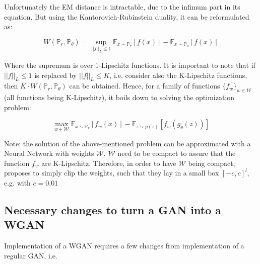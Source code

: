 \documentclass[11pt,a4paper,twoside]{report}
\begin{document}
Unfortunately the EM distance is intractable, due to the infimum part in its equation. But using the Kantorovich-Rubinstein duality, it can be reformulated as:



\begin{equation}
    W(\mathbb{P}_r, \mathbb{P}_{\theta}) = \sup_{||f||_L \leq 1} \mathbb{E}_{x \sim \mathbb{P}_r} [f(x)] - \mathbb{E}_{x \sim \mathbb{P}_{\theta}} [f(x)] 
\end{equation}

Where the supremum is over 1-Lipschitz functions. It is important to note that if $||f||_L \leq 1$  is replaced by $||f||_L \leq K$, i.e. consider also the K-Lipschitz functions, then $K \cdot W(\mathbb{P}_r, \mathbb{P}_{\theta})$ can be obtained. Hence, for a family of functions $\{f_w\}_{w \in \mathcal{W}}$ (all functions being K-Lipschitz), it boils down to solving the optimization problem:

\begin{equation}
    \max_{w \in \mathcal{W}}  \mathbb{E}_{x \sim \mathbb{P}_r}[f_w(x)] - \mathbb{E}_{z \sim p(z)}[f_w(g_{\theta}(z))]
\end{equation}

Note: the solution of the above-mentioned problem can be approximated with a Neural Network with weights $\mathcal{W}$. $\mathcal{W}$ need to be compact to assure that the function $f_w$ are K-Lipschitz. Therefore, in order to have $\mathcal{W}$ being compact, \cite{arjovsky2017wasserstein} proposes to simply clip the weights, such that they lay in a small box $[-c, c]^l$, e.g. with $c = 0.01$

\subsection{Necessary changes to turn a GAN into a WGAN}

Implementation of a WGAN requires a few changes from implementation of a regular GAN, i.e. 
\end{document}
